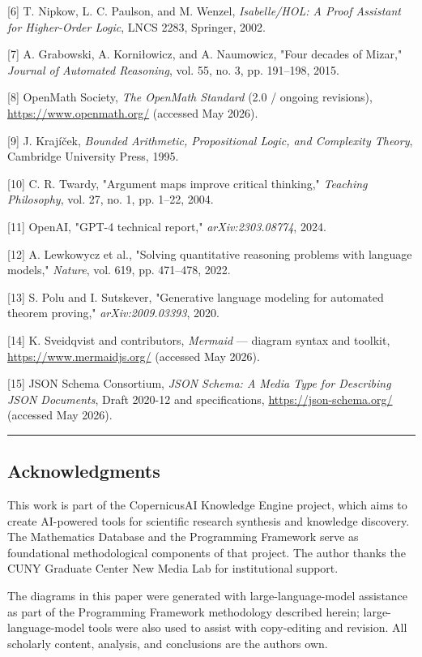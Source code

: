 \documentclass[
  11pt]{article}
\begin{document}
{[}6{]} T. Nipkow, L. C. Paulson, and M. Wenzel, \emph{Isabelle/HOL: A
Proof Assistant for Higher-Order Logic}, LNCS 2283, Springer, 2002.

{[}7{]} A. Grabowski, A. Korniłowicz, and A. Naumowicz, "Four decades of
Mizar," \emph{Journal of Automated Reasoning}, vol. 55, no. 3, pp.
191--198, 2015.

{[}8{]} OpenMath Society, \emph{The OpenMath Standard} (2.0 / ongoing
revisions), \url{https://www.openmath.org/} (accessed May 2026).

{[}9{]} J. Krajíček, \emph{Bounded Arithmetic, Propositional Logic, and
Complexity Theory}, Cambridge University Press, 1995.

{[}10{]} C. R. Twardy, "Argument maps improve critical thinking,"
\emph{Teaching Philosophy}, vol. 27, no. 1, pp. 1--22, 2004.

{[}11{]} OpenAI, "GPT-4 technical report," \emph{arXiv:2303.08774},
2024.

{[}12{]} A. Lewkowycz et al., "Solving quantitative reasoning problems
with language models," \emph{Nature}, vol. 619, pp. 471--478, 2022.

{[}13{]} S. Polu and I. Sutskever, "Generative language modeling for
automated theorem proving," \emph{arXiv:2009.03393}, 2020.

{[}14{]} K. Sveidqvist and contributors, \emph{Mermaid} --- diagram
syntax and toolkit, \url{https://www.mermaidjs.org/} (accessed May
2026).

{[}15{]} JSON Schema Consortium, \emph{JSON Schema: A Media Type for
Describing JSON Documents}, Draft 2020-12 and specifications,
\url{https://json-schema.org/} (accessed May 2026).

\begin{center}\rule{0.5\linewidth}{0.5pt}\end{center}

\hypertarget{acknowledgments}{%
\subsection{Acknowledgments}\label{acknowledgments}}

This work is part of the CopernicusAI Knowledge Engine project, which
aims to create AI-powered tools for scientific research synthesis and
knowledge discovery. The Mathematics Database and the Programming
Framework serve as foundational methodological components of that
project. The author thanks the CUNY Graduate Center New Media Lab for
institutional support.

The diagrams in this paper were generated with large-language-model
assistance as part of the Programming Framework methodology described
herein; large-language-model tools were also used to assist with
copy-editing and revision. All scholarly content, analysis, and
conclusions are the author\textquotesingle s own.
\end{document}
